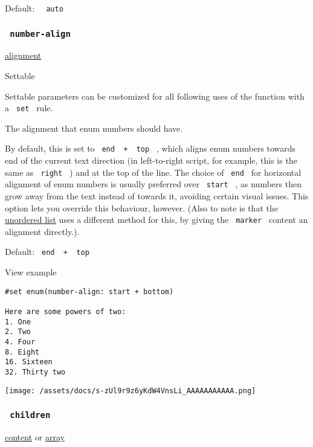 Default: \texttt{\ }{\texttt{\ auto\ }}\texttt{\ }

\subsubsection{\texorpdfstring{\texttt{\ number-align\ }}{ number-align }}\label{parameters-number-align}

\href{/docs/reference/layout/alignment/}{alignment}

{{ Settable }}

\label{parameters-number-align-settable-tooltip}
Settable parameters can be customized for all following uses of the
function with a \texttt{\ set\ } rule.

The alignment that enum numbers should have.

By default, this is set to
\texttt{\ end\ }{\texttt{\ +\ }}\texttt{\ top\ } , which aligns enum
numbers towards end of the current text direction (in left-to-right
script, for example, this is the same as \texttt{\ right\ } ) and at the
top of the line. The choice of \texttt{\ end\ } for horizontal alignment
of enum numbers is usually preferred over \texttt{\ start\ } , as
numbers then grow away from the text instead of towards it, avoiding
certain visual issues. This option lets you override this behaviour,
however. (Also to note is that the
\href{/docs/reference/model/list/}{unordered list} uses a different
method for this, by giving the \texttt{\ marker\ } content an alignment
directly.).

Default: \texttt{\ end\ }{\texttt{\ +\ }}\texttt{\ top\ }


View example

\begin{verbatim}
#set enum(number-align: start + bottom)

Here are some powers of two:
1. One
2. Two
4. Four
8. Eight
16. Sixteen
32. Thirty two
\end{verbatim}

\texttt{[image: /assets/docs/s-zUl9r9z6yKdW4VnsLi\_AAAAAAAAAAA.png]}

\subsubsection{\texorpdfstring{\texttt{\ children\ }}{ children }}\label{parameters-children}

\href{/docs/reference/foundations/content/}{content} {or}
\href{/docs/reference/foundations/array/}{array}

